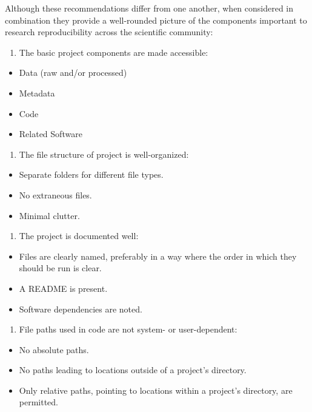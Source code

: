 \documentclass[12pt,twoside]{reedthesis}
\providecommand{\tightlist}{%
  \setlength{\itemsep}{0pt}\setlength{\parskip}{0pt}}
\begin{document}
Although these recommendations differ from one another, when considered
in combination they provide a well-rounded picture of the components
important to research reproducibility across the scientific community:
\begin{enumerate}
\def\labelenumi{\arabic{enumi}.}
\tightlist
\item
  The basic project components are made accessible:
\end{enumerate}
\begin{itemize}
\tightlist
\item
  Data (raw and/or processed)
\item
  Metadata
\item
  Code
\item
  Related Software
\end{itemize}
\begin{enumerate}
\def\labelenumi{\arabic{enumi}.}
\setcounter{enumi}{1}
\tightlist
\item
  The file structure of project is well-organized:
\end{enumerate}
\begin{itemize}
\tightlist
\item
  Separate folders for different file types.
\item
  No extraneous files.
\item
  Minimal clutter.
\end{itemize}
\begin{enumerate}
\def\labelenumi{\arabic{enumi}.}
\setcounter{enumi}{2}
\tightlist
\item
  The project is documented well:
\end{enumerate}
\begin{itemize}
\tightlist
\item
  Files are clearly named, preferably in a way where the order in which
  they should be run is clear.
\item
  A README is present.
\item
  Software dependencies are noted.
\end{itemize}
\begin{enumerate}
\def\labelenumi{\arabic{enumi}.}
\setcounter{enumi}{3}
\tightlist
\item
  File paths used in code are not system- or user-dependent:
\end{enumerate}
\begin{itemize}
\tightlist
\item
  No absolute paths.
\item
  No paths leading to locations outside of a project's directory.
\item
  Only relative paths, pointing to locations within a project's
  directory, are permitted.
\end{itemize}
\end{document}
